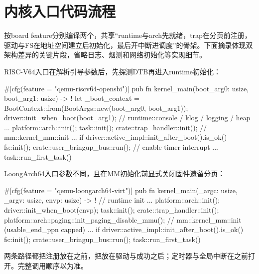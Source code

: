 \section{内核入口代码流程}

按board feature分别编译两个，共享``runtime与arch先就绪，trap在分页前注册，驱动与FS在地址空间建立后初始化，最后开中断进调度''的骨架。下面摘录体现双架构差异的关键片段，省略日志、烟测和网络初始化等实现细节。

RISC-V64入口在解析引导参数后，先探测DTB再进入runtime初始化：

\begin{rustcode}
#[cfg(feature = "qemu-riscv64-opensbi")]
pub fn kernel_main(boot_arg0: usize, boot_arg1: usize) -> ! {
    let _boot_context = BootContext::from(BootArgs::new(boot_arg0, boot_arg1));
    driver::init_when_boot(boot_arg1);
    // runtime::console / klog / logging / heap ...
    platform::arch::init();
    task::init();
    crate::trap_handler::init();
    // mm::kernel_mm::init ...
    if driver::active_impl::init_after_boot().is_ok() {
        fs::init();
        crate::user_bringup_bus::run();
    }
    // enable timer interrupt ...
    task::run_first_task()
}
\end{rustcode}

LoongArch64入口参数不同，且在MM初始化前显式关闭固件遗留分页：

\begin{rustcode}
#[cfg(feature = "qemu-loongarch64-virt")]
pub fn kernel_main(_argc: usize, _argv: usize, envp: usize) -> ! {
    // runtime init ...
    platform::arch::init();
    driver::init_when_boot(envp);
    task::init();
    crate::trap_handler::init();
    platform::arch::paging::init_paging_disable_mmu();
    // mm::kernel_mm::init (usable_end_ppn capped) ...
    if driver::active_impl::init_after_boot().is_ok() {
        fs::init();
        crate::user_bringup_bus::run();
    }
    task::run_first_task()
}
\end{rustcode}

两条路径都把注册放在之前，把放在驱动与成功之后；定时器与全局中断在之前打开。完整调用顺序以为准。
